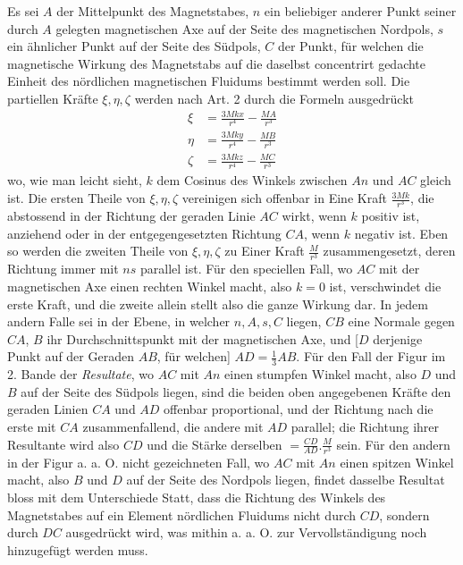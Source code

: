 Es sei $A$ der Mittelpunkt des Magnetstabes, $n$ ein beliebiger anderer Punkt seiner durch $A$ gelegten magnetischen Axe auf der Seite des magnetischen Nordpols, $s$ ein ähnlicher Punkt auf der Seite des Südpols, $C$ der Punkt, für welchen die magnetische Wirkung des Magnetstabs auf die daselbst concentrirt gedachte Einheit des nördlichen magnetischen Fluidums bestimmt werden soll. Die partiellen Kräfte $\xi,\eta,\zeta$ werden nach Art. 2 durch die Formeln ausgedrückt
\[
\begin{aligned}
\xi&=\frac{3Mkx}{r^4}-\frac{MA}{r^3}\\
\eta&=\frac{3Mky}{r^4}-\frac{MB}{r^3}\\
\zeta&=\frac{3Mkz}{r^4}-\frac{MC}{r^3}
\end{aligned}
\]
wo, wie man leicht sieht, $k$ dem Cosinus des Winkels zwischen $An$ und $AC$ gleich ist. Die ersten Theile von $\xi,\eta,\zeta$ vereinigen sich offenbar in Eine Kraft $\frac{3Mk}{r^3}$, die abstossend in der Richtung der geraden Linie $AC$ wirkt, wenn $k$ positiv ist, anziehend oder in der entgegengesetzten Richtung $CA$, wenn $k$ negativ ist. Eben so werden die zweiten Theile von $\xi,\eta,\zeta$ zu Einer Kraft $\frac{M}{r^3}$ zusammengesetzt, deren Richtung immer mit $ns$ parallel ist. Für den speciellen Fall, wo $AC$ mit der magnetischen Axe einen rechten Winkel macht, also $k=0$ ist, verschwindet die erste Kraft, und die zweite allein stellt also die
ganze Wirkung dar. In jedem andern Falle sei in der Ebene, in welcher $n,A,s,C$ liegen, $CB$ eine Normale gegen $CA$, $B$ ihr Durchschnittspunkt mit der magnetischen Axe, und [$D$ derjenige Punkt auf der Geraden $AB$, für welchen] $AD=\tfrac13AB$. Für den Fall der Figur im 2. Bande der \textit{Resultate}, wo $AC$ mit $An$ einen stumpfen Winkel macht, also $D$ und $B$ auf der Seite des Südpols liegen, sind die beiden oben angegebenen Kräfte den geraden Linien $CA$ und $AD$ offenbar proportional, und der Richtung nach die erste mit $CA$ zusammenfallend, die andere mit $AD$ parallel; die Richtung ihrer Resultante wird also $CD$ und die Stärke derselben $=\frac{CD}{AD}.\frac{M}{r^3}$ sein. Für den andern in der Figur a. a. O. nicht gezeichneten Fall, wo $AC$ mit $An$ einen spitzen Winkel macht, also $B$ und $D$ auf der Seite des Nordpols liegen, findet dasselbe Resultat bloss mit dem Unterschiede Statt, dass die Richtung des Winkels des Magnetstabes auf ein Element nördlichen Fluidums nicht durch $CD$, sondern durch $DC$ ausgedrückt wird, was mithin a. a. O. zur Vervollständigung noch hinzugefügt werden muss.
